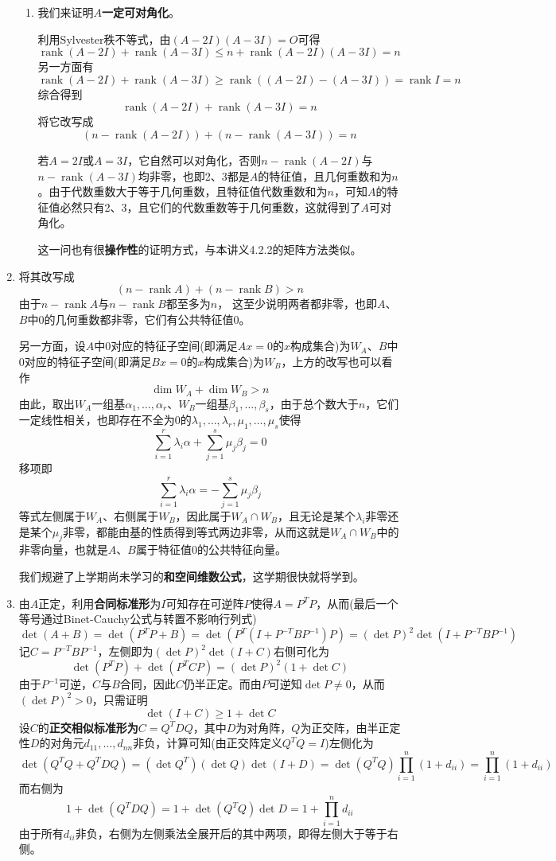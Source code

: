 \documentclass[a4paper,UTF8,fontset=windows,AutoFakeBold]{ctexart}
\DeclareMathOperator{\rank}{rank}
\newcommand*{\note}{\noindent *}
\begin{document}
\begin{enumerate}
\begin{enumerate}
        \item 我们来证明$A$\textbf{一定可对角化}。
        
        利用Sylvester秩不等式，由$(A-2I)(A-3I)=O$可得
        $$\rank(A-2I)+\rank(A-3I)\le n+\rank(A-2I)(A-3I)=n$$
        另一方面有
        $$\rank(A-2I)+\rank(A-3I)\ge \rank((A-2I)-(A-3I))=\rank I=n$$
        综合得到
        $$\rank(A-2I)+\rank(A-3I)=n$$
        将它改写成
        $$(n-\rank(A-2I))+(n-\rank(A-3I))=n$$

        若$A=2I$或$A=3I$，它自然可以对角化，否则$n-\rank(A-2I)$与$n-\rank(A-3I)$均非零，也即2、3都是$A$的特征值，且几何重数和为$n$。由于代数重数大于等于几何重数，且特征值代数重数和为$n$，可知$A$的特征值必然只有2、3，且它们的代数重数等于几何重数，这就得到了$A$可对角化。
        
        \note 这一问也有很\textbf{操作性}的证明方式，与本讲义4.2.2的矩阵方法类似。
    \end{enumerate}

    \item
    将其改写成
    $$(n-\rank A)+(n-\rank B)>n$$
    由于$n-\rank A$与$n-\rank B$都至多为$n$， 这至少说明两者都非零，也即$A$、$B$中0的几何重数都非零，它们有公共特征值0。

    另一方面，设$A$中0对应的特征子空间(即满足$Ax=0$的$x$构成集合)为$W_A$、$B$中0对应的特征子空间(即满足$Bx=0$的$x$构成集合)为$W_B$，上方的改写也可以看作
    $$\dim W_A+\dim W_B>n$$
    由此，取出$W_A$一组基$\alpha_1,\dots,\alpha_r$、$W_B$一组基$\beta_1,\dots,\beta_s$，由于总个数大于$n$，它们一定线性相关，也即存在不全为0的$\lambda_1,\dots,\lambda_r,\mu_1,\dots,\mu_s$使得
    $$\sum_{i=1}^r\lambda_i\alpha+\sum_{j=1}^s\mu_j\beta_j=0$$
    移项即
    $$\sum_{i=1}^r\lambda_i\alpha=-\sum_{j=1}^s\mu_j\beta_j$$
    等式左侧属于$W_A$、右侧属于$W_B$，因此属于$W_A\cap W_B$，且无论是某个$\lambda_i$非零还是某个$\mu_j$非零，都能由基的性质得到等式两边非零，从而这就是$W_A\cap W_B$中的非零向量，也就是$A$、$B$属于特征值0的公共特征向量。

    \note 我们规避了上学期尚未学习的\textbf{和空间维数公式}，这学期很快就将学到。

    \item
    由$A$正定，利用\textbf{合同标准形}为$I$可知存在可逆阵$P$使得$A=P^TP$，从而(最后一个等号通过Binet-Cauchy公式与转置不影响行列式)
    $$\det(A+B)=\det(P^TP+B)=\det(P^T(I+P^{-T}BP^{-1})P)=(\det P)^2\det(I+P^{-T}BP^{-1})$$
    记$C=P^{-T}BP^{-1}$，左侧即为$(\det P)^2\det(I+C)$右侧可化为
    $$\det(P^TP)+\det(P^TCP)=(\det P)^2(1+\det C)$$
    由于$P^{-1}$可逆，$C$与$B$合同，因此$C$仍半正定。而由$P$可逆知$\det P\ne0$，从而$(\det P)^2>0$，只需证明
    $$\det(I+C)\ge1+\det C$$
    设$C$的\textbf{正交相似标准形为}$C=Q^TDQ$，其中$D$为对角阵，$Q$为正交阵，由半正定性$D$的对角元$d_{11},\dots,d_{nn}$非负，计算可知(由正交阵定义$Q^TQ=I$)左侧化为
    $$\det(Q^TQ+Q^TDQ)=(\det Q^T)(\det Q)\det(I+D)=\det(Q^TQ)\prod_{i=1}^n(1+d_{ii})=\prod_{i=1}^n(1+d_{ii})$$
    而右侧为
    $$1+\det(Q^TDQ)=1+\det(Q^TQ)\det D=1+\prod_{i=1}^nd_{ii}$$
    由于所有$d_{ii}$非负，右侧为左侧乘法全展开后的其中两项，即得左侧大于等于右侧。


\end{enumerate}
\end{document}
